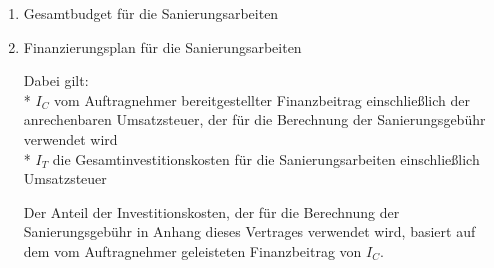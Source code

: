 \begin{enumerate}

\item{Gesamtbudget für die Sanierungsarbeiten}


\begin{center}
\end{center}

\item{Finanzierungsplan für die Sanierungsarbeiten}


\begin{center}
\end{center}

\vspace{5mm}
Dabei gilt:\\* %
$I_C$ \quad \quad vom Auftragnehmer bereitgestellter Finanzbeitrag einschließlich der anrechenbaren Umsatzsteuer, der für die Berechnung der Sanierungsgebühr verwendet wird\\*
$I_T$ \quad \quad die Gesamtinvestitionskosten für die Sanierungsarbeiten einschließlich Umsatzsteuer

\vspace{5mm}
Der Anteil der Investitionskosten, der für die Berechnung der Sanierungsgebühr in Anhang dieses Vertrages verwendet wird, basiert auf dem vom Auftragnehmer geleisteten Finanzbeitrag von $I_C$.


\end{enumerate}
